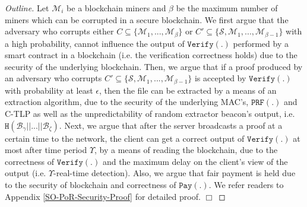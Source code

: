 \begin{proof}[Outline]
Let $\mathcal{M}_{\scriptscriptstyle i}$ be a blockchain miners and $\beta$ be the maximum number of miners which can be corrupted in a secure blockchain. We first argue that the adversary who corrupts either $C\subseteq\{\mathcal{M}_{\scriptscriptstyle 1},...,\mathcal{M}_{\scriptscriptstyle\beta}\}$ or $C'\subseteq\{\mathcal{S},\mathcal{M}_{\scriptscriptstyle 1},...,\mathcal{M}_{\scriptscriptstyle\beta-1}\}$ with a high probability, cannot influence the output of $\mathtt{Verify}(.)$ performed by a smart contract in a blockchain (i.e. the verification correctness holds) due to the security of the underlying blockchain. Then, we argue that if a proof produced by an adversary who corrupts $C'\subseteq\{\mathcal{S},\mathcal{M}_{\scriptscriptstyle 1},...,\mathcal{M}_{\scriptscriptstyle\beta-1}\}$ is accepted by $\mathtt{Verify(.)}$ with probability at least $\epsilon$, then the file can be extracted by a means of an extraction algorithm, due to the security of the underlying MAC's, $\mathtt{PRF}(.)$ and C-TLP as well as the unpredictability of  random extractor beacon's output, i.e. $\mathtt{H}( \mathcal {B}_{\scriptscriptstyle \gamma}||...||  \mathcal {B}_{\scriptscriptstyle \zeta})$. Next,  we argue that  after the server broadcasts a proof at a certain time to the network, the client can get a correct output of $\mathtt{Verify}(.)$ at most after time period $\Upsilon$, by a means of  reading the blockchain, due to the correctness of $\mathtt{Verify}(.)$ and the maximum delay on the client’s view of the output  (i.e. $\Upsilon$-real-time detection). Also, we argue that fair payment is held due to the security of blockchain and correctness of $\mathtt{Pay}(.)$. We refer readers to Appendix \ref{SO-PoR-Security-Proof} for detailed proof.
\hfill\(\Box\)
\end{proof}



